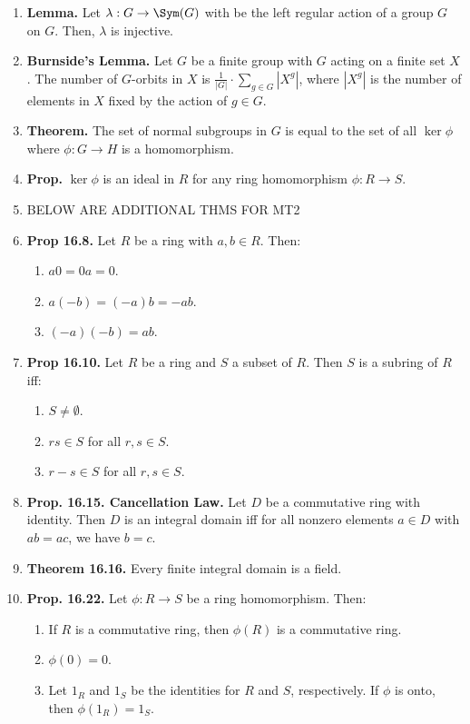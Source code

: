\begin{enumerate}
	\item \textbf{Lemma. } Let $\lambda: G \to \Sym(G)$ with be the left regular action of a group $G$ on $G$. Then, $\lambda$ is injective. 
	\item \textbf{Burnside's Lemma. } Let $G$ be a finite group with $G$ acting on a finite set $X$. The number of $G$-orbits in $X$ is $\frac{1}{|G|} \cdot \sum_{g \in G} |X^g|$, where $|X^g|$ is the number of elements in $X$ fixed by the action of $g \in G$. 
	\item \textbf{Theorem. } The set of normal subgroups in $G$ is equal to the set of all $\ker \phi$ where $\phi: G \to H$ is a homomorphism. 
	\item \textbf{Prop. } $\ker\phi$ is an ideal in $R$ for any ring homomorphism $\phi: R \to S$. 
	\item BELOW ARE ADDITIONAL THMS FOR MT2
	\item \textbf{Prop 16.8. } Let $R$ be a ring with $a,b \in R$. Then: 
	\begin{enumerate}
		\item $a0=0a=0$. 
		\item $a(-b)=(-a)b=-ab$. 
		\item $(-a)(-b) = ab$. 
	\end{enumerate}
	\item \textbf{Prop 16.10. } Let $R$ be a ring and $S$ a subset of $R$. Then $S$ is a subring of $R$ iff: 
	\begin{enumerate}
		\item $S \neq \emptyset$. 
		\item $rs \in S$ for all $r,s \in S$. 
		\item $r-s \in S$ for all $r,s \in S$. 
	\end{enumerate}
	\item \textbf{Prop. 16.15. Cancellation Law. } Let $D$ be a commutative ring with identity. Then $D$ is an integral domain iff for all nonzero elements $a \in D$ with $ab=ac$, we have $b=c$. 
        \item \textbf{Theorem 16.16. } Every finite integral domain is a field. 
	\item \textbf{Prop. 16.22. } Let $\phi:R \to S$ be a ring homomorphism. Then: 
        \begin{enumerate}
            \item If $R$ is a commutative ring, then $\phi(R)$ is a commutative ring. 
            \item $\phi(0)=0$. 
            \item Let $1_R$ and $1_S$ be the identities for $R$ and $S$, respectively. If $\phi$ is onto, then $\phi(1_R) = 1_S$. 

\end{enumerate}
\end{enumerate}

